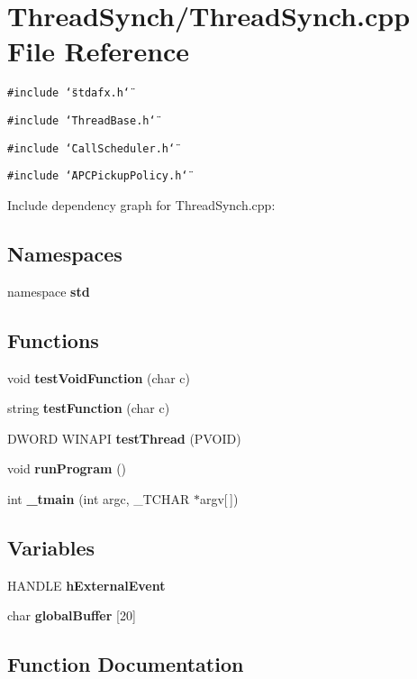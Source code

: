 \section{Thread\-Synch/Thread\-Synch.cpp File Reference}
\label{_thread_synch_8cpp}
{\tt \#include \char`\"{}stdafx.h\char`\"{}}\par
{\tt \#include \char`\"{}Thread\-Base.h\char`\"{}}\par
{\tt \#include \char`\"{}Call\-Scheduler.h\char`\"{}}\par
{\tt \#include \char`\"{}APCPickup\-Policy.h\char`\"{}}\par


Include dependency graph for Thread\-Synch.cpp:\subsection*{Namespaces}
\begin{CompactItemize}
\item 
namespace {\bf std}
\end{CompactItemize}
\subsection*{Functions}
\begin{CompactItemize}
\item 
void {\bf test\-Void\-Function} (char c)
\item 
string {\bf test\-Function} (char c)
\item 
DWORD WINAPI {\bf test\-Thread} (PVOID)
\item 
void {\bf run\-Program} ()
\item 
int {\bf \_\-tmain} (int argc, \_\-TCHAR $\ast$argv[$\,$])
\end{CompactItemize}
\subsection*{Variables}
\begin{CompactItemize}
\item 
HANDLE {\bf h\-External\-Event}
\item 
char {\bf global\-Buffer} [20]
\end{CompactItemize}


\subsection{Function Documentation}
